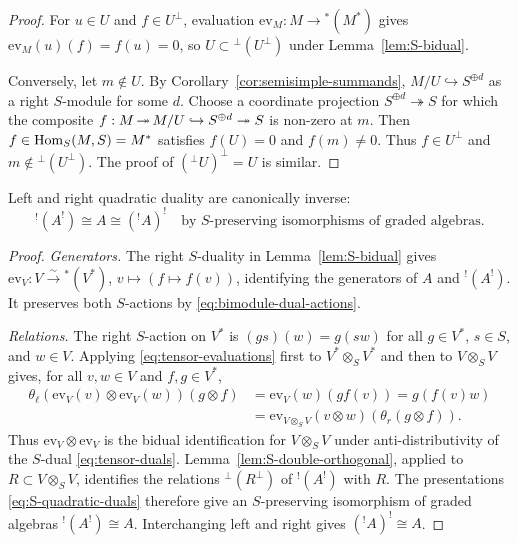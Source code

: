 \begin{advanced}
\begin{proof}
For $u\in U$ and $f\in U^\perp$, evaluation $\mathrm{ev}_M:M\to{}^*(M^*)$ gives $\mathrm{ev}_M(u)(f)=f(u)=0$, so $U\subset{}^\perp(U^\perp)$ under Lemma~\ref{lem:S-bidual}.

Conversely, let $m\notin U$.
By Corollary~\ref{cor:semisimple-summands}, $M/U\hookrightarrow S^{\oplus d}$ as a right $S$-module for some $d$.
Choose a coordinate projection $S^{\oplus d}\twoheadrightarrow S$ for which the composite $f:M\operatorname{\twoheadrightarrow} M/U\hookrightarrow S^{\oplus d}\twoheadrightarrow S$ is non-zero at $m$.
Then $f\in\operatorname{Hom}\nolimits_S(M,S)=M^*$ satisfies $f(U)=0$ and $f(m)\neq0$.
Thus $f\in U^\perp$ and $m\notin{}^\perp(U^\perp)$.
The proof of $({}^\perp U)^\perp=U$ is similar.
\end{proof}

\begin{theorem}\label{thm:quadratic-bidual}
Left and right quadratic duality are canonically inverse:
\[
{}^!(A^!)\cong A\cong({}^!A)^!
\quad\text{by }S\text{-preserving isomorphisms of graded algebras}.
\]
\end{theorem}

\begin{proof}
\emph{Generators.} The right $S$-duality in Lemma~\ref{lem:S-bidual} gives
$\mathrm{ev}_V:V\xrightarrow{\sim}{}^*(V^*)$, $v\mapsto(f\mapsto f(v))$, identifying the generators of $A$ and $ {}^!(A^!)$.
It preserves both $S$-actions by \eqref{eq:bimodule-dual-actions}.

\emph{Relations.} The right $S$-action on $V^*$ is $(gs)(w)=g(sw)$ for all $g\in V^*$, $s\in S$, and $w\in V$.
Applying \eqref{eq:tensor-evaluations} first to $V^*\otimes_S V^*$ and then to $V\otimes_S V$ gives, for all $v,w\in V$ and $f,g\in V^*$,
\begin{equation}\label{eq:S-bidual-tensor-square}
\begin{aligned}
\theta_\ell(\mathrm{ev}_V(v)\otimes\mathrm{ev}_V(w))(g\otimes f)
&=\mathrm{ev}_V(w)(g f(v))=g(f(v)w)\\
&=\mathrm{ev}_{V\otimes_S V}(v\otimes w)(\theta_r(g\otimes f)).
\end{aligned}
\end{equation}
Thus $\mathrm{ev}_V\otimes\mathrm{ev}_V$ is the bidual identification for $V\otimes_S V$ under anti-distributivity of the $S$-dual \eqref{eq:tensor-duals}.
Lemma~\ref{lem:S-double-orthogonal}, applied to $R\subset V\otimes_S V$, identifies the relations $ {}^\perp(R^\perp)$ of $ {}^!(A^!)$ with $R$.
The presentations \eqref{eq:S-quadratic-duals} therefore give an $S$-preserving isomorphism of graded algebras $ {}^!(A^!)\cong A$.
Interchanging left and right gives $({}^!A)^!\cong A$.
\end{proof}


\end{advanced}
